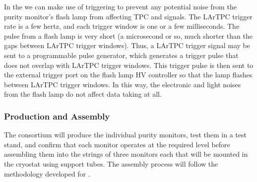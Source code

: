 In the  we can make use of triggering to prevent any potential noise from the purity monitor's flash lamp from affecting TPC and  signals. The LArTPC trigger rate is a few hertz, and each trigger window is one or a few milliseconds. %
The pulse from a flash lamp is very short (a microsecond or so, much shorter than the gaps between LArTPC trigger windows). 
Thus, a LArTPC trigger signal may be sent to a programmable pulse generator, %
which generates a trigger pulse that does not overlap with LArTPC trigger windows. This trigger pulse %
is then sent to the external trigger port on the flash lamp HV controller so that the lamp flashes between LArTPC trigger windows. In this way, the electronic and light noises from the flash lamp do %
not affect %
data taking at all.




\subsubsection{Production and Assembly}
\label{sec:PrMon-Production-Assembly}

The  consortium will produce the individual purity monitors, test them in a test stand, and confirm that each monitor operates at the required level before assembling them into the strings of three monitors each that will be mounted in the  cryostat using support tubes. The assembly process will follow the methodology developed for .

